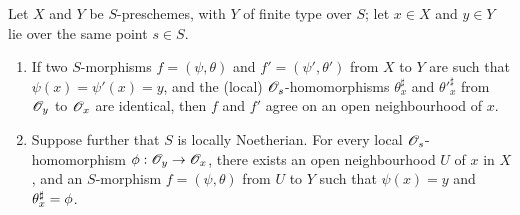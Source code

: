 \begin{prop}[6.5.1]
\label{1.6.5.1}
Let $X$ and $Y$ be $S$-preschemes, with $Y$ of finite type over $S$;
let $x\in X$ and $y\in Y$ lie over the same point $s\in S$.
\begin{enumerate}[label=\emph{(\roman*)}]
    \item If two $S$-morphisms $f=(\psi,\theta)$ and $f'=(\psi',\theta')$ from $X$ to $Y$ are such that $\psi(x)=\psi'(x)=y$, and the (local) $\mathscr{O}_s$-homomorphisms $\theta_x^\sharp$ and ${\theta'}_x^\sharp$ from $\mathscr{O}_y$ to $\mathscr{O}_x$ are identical, then $f$ and $f'$ agree on an open neighbourhood of $x$.
    \item Suppose further that $S$ is locally Noetherian.
        For every local $\mathscr{O}_s$-homomorphism $\phi:\mathscr{O}_y\to\mathscr{O}_x$, there exists an open neighbourhood $U$ of $x$ in $X$, and an $S$-morphism $f=(\psi,\theta)$ from $U$ to $Y$ such that $\psi(x)=y$ and $\theta_x^\sharp=\phi$.
\end{enumerate}
\end{prop}


